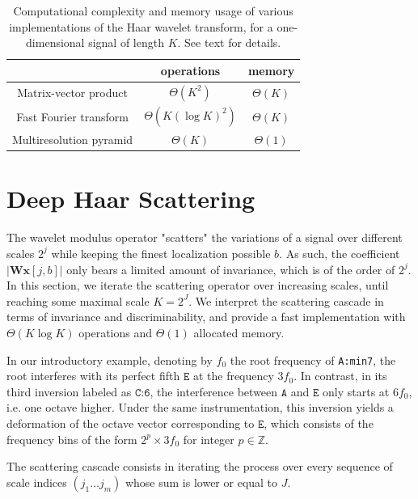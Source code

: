 \documentclass{article}
\makeatletter
\newcommand*{\ie}{i.e.\@\xspace}
\makeatother
\begin{document}
\begin{table}
	\begin{center}
	\begin{tabular}{|c|cc|}
		\hline
		& operations & memory \\
		\hline
		Matrix-vector product & $\Theta(K^2)$ & $\Theta(K)$ \\
		Fast Fourier transform & $\Theta(K (\log K)^2)$ & $\Theta(K)$ \\
		Multiresolution pyramid & $\Theta(K)$ & $\Theta(1)$ \\
		\hline		
	\end{tabular}
	\end{center}
	\caption{
	Computational complexity and memory usage of various implementations
	of the Haar wavelet transform, for a one-dimensional signal of length $K$.
	See text for details.
	\label{table:wavelet-complexities}}
\end{table}


\section{Deep Haar Scattering}\label{sec:scattering}
The wavelet modulus operator "scatters" the variations of a signal over
different scales $2^j$ while keeping the finest localization possible $b$.
As such, the coefficient $\vert \boldsymbol{Wx}[j, b] \vert$
only bears a limited amount of invariance, which is of the order
of $2^j$.
In this section, we iterate the scattering operator over increasing scales,
until reaching some maximal scale $K=2^J$.
We interpret the scattering cascade in terms of invariance and discriminability,
and provide a fast implementation with $\Theta(K \log K)$ operations
and $\Theta(1)$ allocated memory.

In our introductory example, denoting by $f_0$ the root frequency of \texttt{A:min7},
the root interferes with its perfect fifth $\texttt{E}$ at the frequency $3 f_0$.
In contrast, in its third inversion labeled as $\texttt{C:6}$, the interference
between $\texttt{A}$ and $\texttt{E}$ only starts at $6 f_0$, \ie one octave higher.
Under the same instrumentation, this inversion yields a deformation of the
octave vector corresponding to $\texttt{E}$, which consists of the frequency bins
of the form $2^p \times 3 f_0$ for integer $p \in \mathbb{Z}$.


The scattering cascade consists in iterating the process over every sequence
of scale indices $(j_1 \ldots j_m)$ whose sum is lower or equal to $J$.
\end{document}
